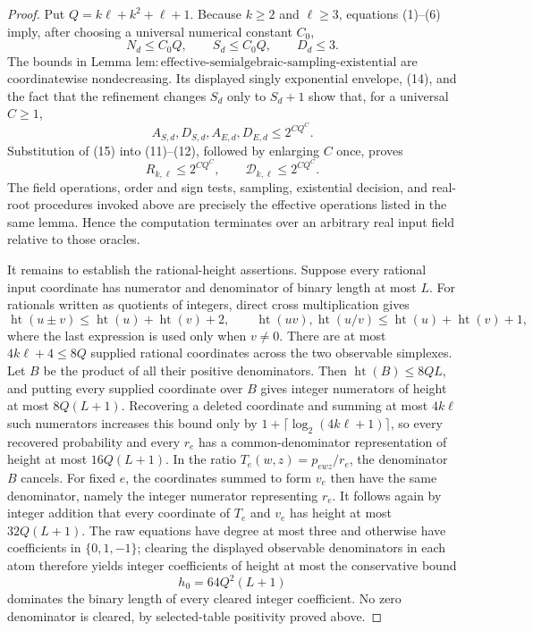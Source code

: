 \documentclass{article}
\begin{document}
\begin{proof}
Put \(Q=k\ell+k^2+\ell+1\).  Because \(k\ge2\) and \(\ell\ge3\), equations (1)--(6) imply, after choosing a universal numerical constant \(C_0\),
\[
N_d\le C_0Q,
\qquad S_d\le C_0Q,
\qquad D_d\le3.                                           \tag{14}
\]
The bounds in Lemma \(\mathrm{lem{:}effective\text{-}semialgebraic\text{-}sampling\text{-}existential}\) are coordinatewise nondecreasing.  Its displayed singly exponential envelope, (14), and the fact that the refinement changes \(S_d\) only to \(S_d+1\) show that, for a universal \(C\ge1\),
\[
A_{S,d},D_{S,d},A_{E,d},D_{E,d}
\le 2^{CQ^C}.                                               \tag{15}
\]
Substitution of (15) into (11)--(12), followed by enlarging \(C\) once, proves
\[
R_{k,\ell}\le2^{CQ^C},
\qquad
\mathcal D_{k,\ell}\le2^{CQ^C}.                          \tag{16}
\]
The field operations, order and sign tests, sampling, existential decision, and real-root procedures invoked above are precisely the effective operations listed in the same lemma.  Hence the computation terminates over an arbitrary real input field relative to those oracles.

It remains to establish the rational-height assertions.  Suppose every rational input coordinate has numerator and denominator of binary length at most \(L\).  For rationals written as quotients of integers, direct cross multiplication gives
\[
\operatorname{ht}(u\pm v)\le
\operatorname{ht}(u)+\operatorname{ht}(v)+2,
\qquad
\operatorname{ht}(uv),\operatorname{ht}(u/v)
\le\operatorname{ht}(u)+\operatorname{ht}(v)+1,           \tag{17}
\]
where the last expression is used only when \(v\ne0\).  There are at most \(4k\ell+4\le8Q\) supplied rational coordinates across the two observable simplexes.  Let \(B\) be the product of all their positive denominators.  Then \(\operatorname{ht}(B)\le8QL\), and putting every supplied coordinate over \(B\) gives integer numerators of height at most \(8Q(L+1)\).  Recovering a deleted coordinate and summing at most \(4k\ell\) such numerators increases this bound only by \(1+\lceil\log_2(4k\ell+1)\rceil\), so every recovered probability and every \(r_e\) has a common-denominator representation of height at most \(16Q(L+1)\).  In the ratio \(T_e(w,z)=p_{ewz}/r_e\), the denominator \(B\) cancels.  For fixed \(e\), the coordinates summed to form \(v_e\) then have the same denominator, namely the integer numerator representing \(r_e\).  It follows again by integer addition that every coordinate of \(T_e\) and \(v_e\) has height at most \(32Q(L+1)\).  The raw equations have degree at most three and otherwise have coefficients in \(\{0,1,-1\}\); clearing the displayed observable denominators in each atom therefore yields integer coefficients of height at most the conservative bound
\[
h_0=64Q^2(L+1)                                             \tag{18}
\]
dominates the binary length of every cleared integer coefficient.  No zero denominator is cleared, by selected-table positivity proved above.


\end{proof}
\end{document}
